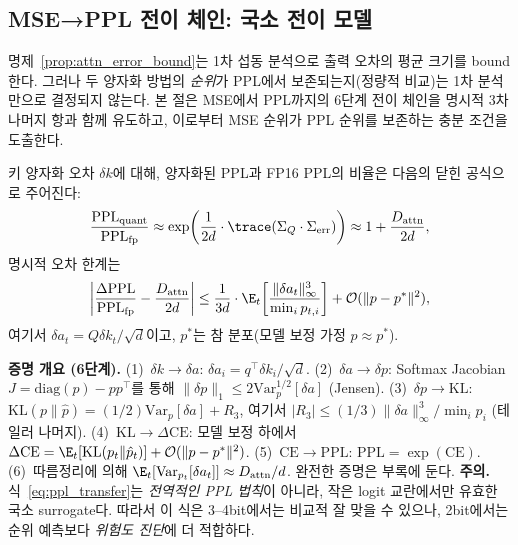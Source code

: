 \subsection{MSE→PPL 전이 체인: 국소 전이 모델}
\label{sec:mse_ppl_chain}

명제~\ref{prop:attn_error_bound}는 1차 섭동 분석으로 출력 오차의 평균 크기를 bound한다. 그러나 두 양자화 방법의 \emph{순위}가 PPL에서 보존되는지(정량적 비교)는 1차 분석만으로 결정되지 않는다. 본 절은 MSE에서 PPL까지의 6단계 전이 체인을 명시적 3차 나머지 항과 함께 유도하고, 이로부터 MSE 순위가 PPL 순위를 보존하는 충분 조건을 도출한다.

\begin{proposition}
\label{prop:mse_ppl_transfer}
키 양자화 오차 $\delta k$에 대해, 양자화된 PPL과 FP16 PPL의 비율은 다음의 닫힌 공식으로 주어진다:
\begin{equation}
\frac{\mathrm{PPL}_{\mathrm{quant}}}{\mathrm{PPL}_{\mathrm{fp}}} \approx \exp\!\left(\frac{1}{2d} \cdot \trace(\Sigma_Q \cdot \Sigma_{\mathrm{err}})\right) \approx 1 + \frac{D_{\mathrm{attn}}}{2d},
\label{eq:ppl_transfer}
\end{equation}
명시적 오차 한계는
\begin{equation}
\left|\frac{\Delta \mathrm{PPL}}{\mathrm{PPL}_{\mathrm{fp}}} - \frac{D_{\mathrm{attn}}}{2d}\right| \leq \frac{1}{3d} \cdot \E_t\!\left[\frac{\lVert \delta a_t \rVert_\infty^3}{\min_i p_{t,i}}\right] + \mathcal{O}(\lVert p - p^* \rVert^2),
\label{eq:ppl_error_bound}
\end{equation}
여기서 $\delta a_t = Q \delta k_t / \sqrt{d}$이고, $p^*$는 참 분포(모델 보정 가정 $p \approx p^*$).
\end{proposition}

\begin{theorycomment}
\textbf{증명 개요 (6단계).}
(1)~$\delta k \to \delta a$: $\delta a_i = q^\top \delta k_i / \sqrt{d}$.
(2)~$\delta a \to \delta p$: Softmax Jacobian $J = \mathrm{diag}(p) - pp^\top$를 통해 $\lVert \delta p \rVert_1 \leq 2 \mathrm{Var}_p^{1/2}[\delta a]$ (Jensen).
(3)~$\delta p \to \mathrm{KL}$: $\mathrm{KL}(p \| \hat{p}) = (1/2) \mathrm{Var}_p[\delta a] + R_3$, 여기서 $|R_3| \leq (1/3) \lVert \delta a \rVert_\infty^3 / \min_i p_i$ (테일러 나머지).
(4)~$\mathrm{KL} \to \Delta \mathrm{CE}$: 모델 보정 하에서 $\Delta \mathrm{CE} = \E_t[\mathrm{KL}(p_t \| \hat{p}_t)] + \mathcal{O}(\lVert p - p^* \rVert^2)$.
(5)~$\mathrm{CE} \to \mathrm{PPL}$: $\mathrm{PPL} = \exp(\mathrm{CE})$.
(6)~따름정리에 의해 $\E_t[\mathrm{Var}_{p_t}[\delta a_t]] \approx D_{\mathrm{attn}}/d$. 완전한 증명은 부록에 둔다.
\textbf{주의.} 식~\eqref{eq:ppl_transfer}는 \emph{전역적인 PPL 법칙}이 아니라, 작은 logit 교란에서만 유효한 국소 surrogate다. 따라서 이 식은 3--4bit에서는 비교적 잘 맞을 수 있으나, 2bit에서는 순위 예측보다 \emph{위험도 진단}에 더 적합하다.
\end{theorycomment}

